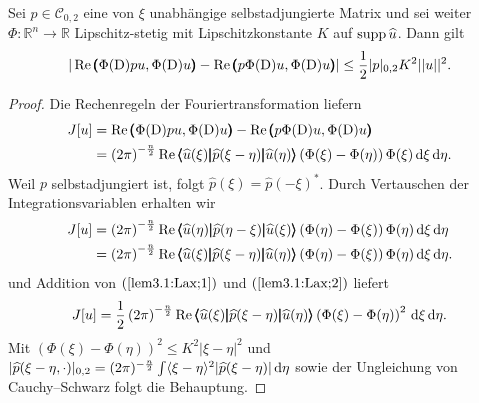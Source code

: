 \begin{lem}\label{lem3.1:Lax}
Sei $p\in \mathcal{C}_{0,2}$ eine von $\xi$ unabhängige selbstadjungierte Matrix und sei weiter $\Phi: \mathbb{R}^n\rightarrow\mathbb{R}$ Lipschitz-stetig mit Lipschitzkonstante $K$ auf $\operatorname{supp} \widehat{u}$. Dann gilt
\begin{equation}
		| \operatorname{Re} \pmb(\Phi(\mathrm D)pu,\Phi(\mathrm D)u\pmb)-\operatorname{Re}\pmb(p\Phi(\mathrm D)u,\Phi(\mathrm D)u\pmb)| \le\frac{1}{2}| p|_{0,2}K^2|| u||^2.
\end{equation}	 
\end{lem}
\begin{proof}
	Die Rechenregeln der Fouriertransformation liefern
	\begin{equation}\label{lem3.1:Lax;1}
		\begin{split} J[u]&=  \operatorname{Re} \pmb(\Phi(\mathrm D)pu,\Phi(\mathrm D)u\pmb)-\operatorname{Re}\pmb(p\Phi(\mathrm D)u,\Phi(\mathrm D)u\pmb) \\
		&= \left(2\pi\right)^{-\frac{n}{2}}\operatorname{Re}\relax\pmb\langle\widehat{u}(\xi)\pmb|\widehat{p}(\xi-\eta)\pmb|\widehat{u}(\eta)\pmb\rangle\left(\Phi(\xi)-\Phi(\eta)\right)\Phi(\xi)\,\mathrm d \xi\,\mathrm d\eta.
		\end{split}
	\end{equation}
	Weil $p$ selbstadjungiert ist, folgt $\widehat{p}(\xi) = {\widehat{p}}(-\xi)^*$. Durch Vertauschen der Integrationsvariablen erhalten wir
	\begin{equation}\label{lem3.1:Lax;2}
	\begin{split}	
	J[u]&= \left(2\pi\right)^{-\frac{n}{2}}\operatorname{Re}\relax \pmb\langle \widehat{u}(\eta)\pmb|\widehat{p}(\eta-\xi)\pmb|\widehat{u}(\xi)\pmb\rangle\left(\Phi(\eta)-\Phi(\xi)\right)\Phi(\eta)\,\mathrm d \xi\,\mathrm d\eta\\
		&= \left(2\pi\right)^{-\frac{n}{2}}\operatorname{Re}\relax\pmb\langle\widehat{u}(\xi)\pmb|\widehat{p}(\xi-\eta)\pmb|\widehat{u}(\eta)\pmb\rangle\left(\Phi(\eta)-\Phi(\xi)\right)\Phi(\eta)\,\mathrm d \xi\,\mathrm d\eta.
	\end{split}	
	\end{equation}
	und Addition von $(\ref{lem3.1:Lax;1})$ und $(\ref{lem3.1:Lax;2})$ liefert
	\begin{equation}
		J[u]= \frac{1}{2}\left(2\pi\right)^{-\frac{n}{2}}\operatorname{Re}\relax \pmb\langle\widehat{u}(\xi)\pmb|\widehat{p}(\xi-\eta)\pmb|\widehat{u}(\eta)\pmb\rangle\left(\Phi(\xi)-\Phi(\eta)\right)^2\,\mathrm d\xi\,\mathrm d\eta.
	\end{equation}
	Mit  $\left(\Phi(\xi)-\Phi(\eta)\right)^2\le K^2 |\xi-\eta|^2$ und $| \widehat{p}(\xi-\eta,\cdot)|_{0,2} = (2\pi)^{-\frac{n}{2}}\int \langle\xi-\eta\rangle^2 |\widehat{p}(\xi-\eta)|\,\mathrm d\eta$ sowie der Ungleichung von Cauchy--Schwarz folgt die Behauptung. 
\end{proof}

